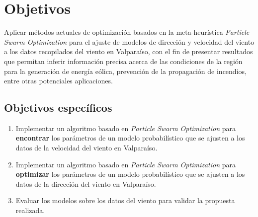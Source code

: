 \section{Objetivos}
Aplicar métodos actuales de optimización basados en la meta-heurística \emph{Particle Swarm Optimization} para el ajuste de modelos de dirección y velocidad del viento a los datos recopilados del viento en Valparaíso, con el fin de presentar resultados que permitan inferir información precisa acerca de las condiciones de la región para la generación de energía eólica, prevención de la propagación de incendios, entre otras potenciales aplicaciones.

\subsection{Objetivos específicos}
\begin{enumerate}
    \item Implementar un algoritmo basado en \emph{Particle Swarm Optimization} para \textbf{encontrar} los parámetros de un modelo probabilístico que se ajusten a los datos de la velocidad del viento en Valparaíso. 
    \item Implementar un algoritmo basado en \emph{Particle Swarm Optimization} para \textbf{optimizar} los parámetros de un modelo probabilístico que se ajusten a los datos de la dirección del viento en Valparaíso.
    \item Evaluar los modelos sobre los datos del viento para validar la propuesta realizada.
\end{enumerate}

